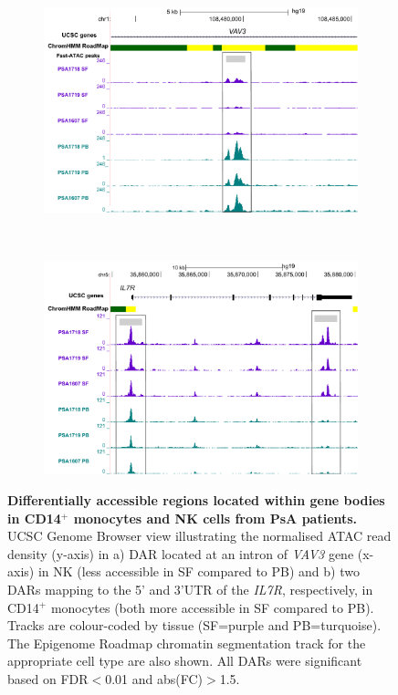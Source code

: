 \bigskip
\begin{figure}[H]
\centering
\begin{subfigure}[b]{0.60\textwidth}
\centering 
\includegraphics[width=\textwidth]{./Results3/pdfs/ATAC_PSA_NK_VAV3}
\caption{}
\end{subfigure}
~
\begin{subfigure}[b]{0.60\textwidth} 
\centering
\includegraphics[width=\textwidth]{./Results3/pdfs/ATAC_PSA_CD14_IL7R}
\caption{}
\end{subfigure}
\caption[Differentially accessible regions located within gene bodies in CD14$^+$ monocytes and NK cells from PsA patients.]{\textbf{Differentially accessible regions located within gene bodies in CD14$^+$ monocytes and NK cells from PsA patients.} UCSC Genome Browser view illustrating the normalised ATAC read density (y-axis) in a) DAR located at an intron of \textit{VAV3} gene (x-axis) in NK (less accessible in SF compared to PB) and b) two DARs mapping to the 5' and 3'UTR of the \textit{IL7R}, respectively, in CD14$^+$ monocytes (both more accessible in SF compared to PB). Tracks are colour-coded by tissue (SF=purple and PB=turquoise). The Epigenome Roadmap chromatin segmentation track for the appropriate cell type are also shown. All DARs were significant based on FDR$<$0.01 and abs(FC)$>$1.5.}
\label{figure:PsA_FAST_ATAC_gene_boy_DOCS_CD14_NK}
\end{figure}



